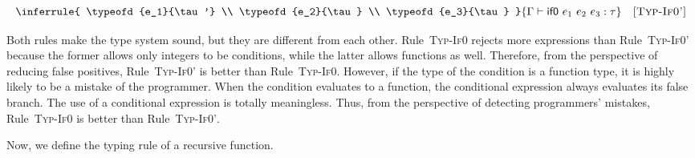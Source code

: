 
\vspace{-1em}

\[
  \inferrule
  { \typeofd{e_1}{\tau'} \\
    \typeofd{e_2}{\tau} \\
    \typeofd{e_3}{\tau} }
  { \typeofd{\eifz{e_1}{e_2}{e_3}}{\tau} }
  \quad\textsc{[Typ-If0']}
\]

Both rules make the type system sound, but they are different from each other.
Rule~\textsc{Typ-If0} rejects more expressions than Rule~\textsc{Typ-If0'}
because the former allows only integers to be conditions, while the latter
allows functions as well. Therefore, from the perspective of reducing false positives,
Rule~\textsc{Typ-If0'} is better than Rule~\textsc{Typ-If0}.
However, if the type of the condition is a function type, it is highly likely to
be a mistake of the programmer. When the condition evaluates to a function, the
conditional expression always evaluates its false branch. The use of a
conditional expression is totally meaningless. Thus, from the perspective of
detecting programmers' mistakes, Rule~\textsc{Typ-If0} is better than
Rule~\textsc{Typ-If0'}.

Now, we define the typing rule of a recursive function.


\vspace{-1em}

